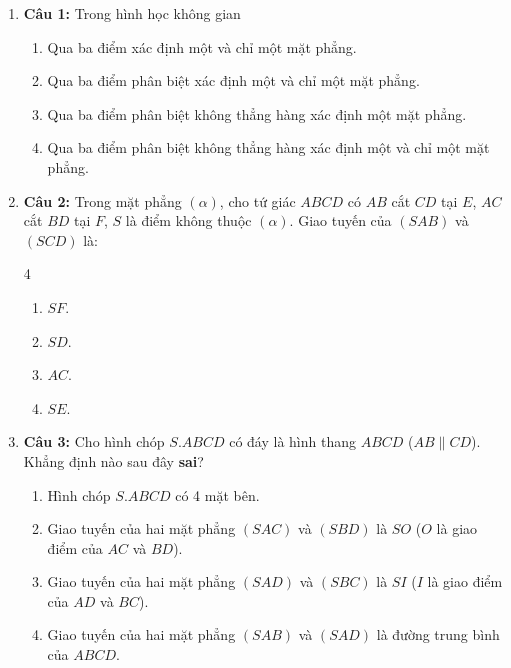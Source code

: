 \documentclass[12pt,a4paper]{extarticle}
\begin{document}
\makeheadbox[headerright={Tổng ôn 10-11},chude={CHỦ ĐỀ 10},tieude={Hình học không gian},dinhdang={Hình học},lop={12 },gv={Nguyễn Lê Minh Ngọc}]

\vspace{2em}

\begin{enumerate}
    \item \textbf{Câu 1:} Trong hình học không gian
    \begin{enumerate}
        \item Qua ba điểm xác định một và chỉ một mặt phẳng.
        \item Qua ba điểm phân biệt xác định một và chỉ một mặt phẳng.
        \item Qua ba điểm phân biệt không thẳng hàng xác định một mặt phẳng.
        \item Qua ba điểm phân biệt không thẳng hàng xác định một và chỉ một mặt phẳng.
    \end{enumerate}
    \item \textbf{Câu 2:} Trong mặt phẳng $(\alpha)$, cho tứ giác $ABCD$ có $AB$ cắt $CD$ tại $E$, $AC$ cắt $BD$ tại $F$, $S$ là điểm không thuộc $(\alpha)$. Giao tuyến của $(SAB)$ và $(SCD)$ là:
    \begin{multicols}{4}
        \begin{enumerate}
            \item $SF$.
            \item $SD$.
            \item $AC$.
            \item $SE$.
        \end{enumerate}
    \end{multicols}
    \item \textbf{Câu 3:} Cho hình chóp $S.ABCD$ có đáy là hình thang $ABCD$ ($AB \parallel CD$). Khẳng định nào sau đây \textbf{sai}?
    \begin{enumerate}
        \item Hình chóp $S.ABCD$ có 4 mặt bên.
        \item Giao tuyến của hai mặt phẳng $(SAC)$ và $(SBD)$ là $SO$ ($O$ là giao điểm của $AC$ và $BD$).
        \item Giao tuyến của hai mặt phẳng $(SAD)$ và $(SBC)$ là $SI$ ($I$ là giao điểm của $AD$ và $BC$).
        \item Giao tuyến của hai mặt phẳng $(SAB)$ và $(SAD)$ là đường trung bình của $ABCD$.

\end{enumerate}
\end{enumerate}
\end{document}
